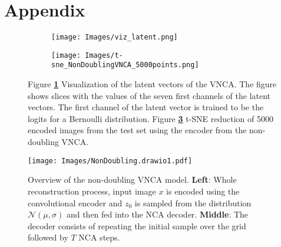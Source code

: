 \section*{Appendix}

\begin{figure}[ht]
    \centering
    \begin{subfigure}{.3\textwidth}
        \centering
        \texttt{[image: Images/viz\_latent.png]}
        \caption{}
        \label{fig:viz_latent}
    \end{subfigure}
    \begin{subfigure}{.3\textwidth}
        \centering
        \texttt{[image: Images/t-sne\_NonDoublingVNCA\_5000points.png]}
        \caption{}
        \label{fig:t-sne_NonDoublingVNCA}
    \end{subfigure}
\caption{Figure \textbf{\ref{fig:viz_latent}} Visualization of the latent vectors of the VNCA. The figure shows slices with the values of the seven first channels of the latent vectors. The first channel of the latent vector is trained to be the logits for a Bernoulli distribution. Figure \textbf{\ref{fig:t-sne_NonDoublingVNCA}} t-SNE reduction of 5000 encoded images from the test set using the encoder from the non-doubling VNCA.}
\end{figure}

\begin{figure}[ht]
    \centering
    \texttt{[image: Images/NonDoubling.drawio1.pdf]}
    \caption{Overview of the non-doubling VNCA model. \textbf{Left}: Whole reconstruction process, input image $x$ is encoded using the convolutional encoder and $z_0$ is sampled from the distribution $\mathcal{N}(\mu, \sigma)$ and then fed into the NCA decoder. \textbf{Middle}: The decoder consists of repeating the initial sample over the grid followed by $T$ NCA steps.}
    \label{fig:NonDoublingVNCAOverview}
\end{figure}